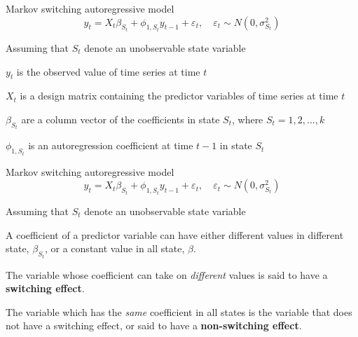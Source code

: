 \documentclass{beamer}
\begin{document}
\begin{frame}

\begin{block}{Markov switching autoregressive model}
\[
y_{t} = X_{t}\beta_{S_{t}} + \phi_{1,S_{t}} y_{t-1} + \varepsilon_{t}, \quad \varepsilon_{t} \sim N(0,\sigma^{2}_{S_{t}})
\]
\end{block}

Assuming that $S_{t}$ denote an unobservable state variable

$y_{t}$ is the observed value of time series at time $t$ 

$X_{t}$ is a design matrix containing the predictor variables of time series at time $t$ 

$\beta_{S_{t}}$ are a column vector of the coefficients in state $S_{t}$, where $S_{t}=1,2,...,k$

$\phi_{1,S_{t}}$ is an autoregression coefficient at time $t-1$ in state $S_{t}$


\end{frame}

\begin{frame}

\begin{block}{Markov switching autoregressive model}
\[
y_{t} = X_{t}\beta_{S_{t}} + \phi_{1,S_{t}} y_{t-1} + \varepsilon_{t}, \quad \varepsilon_{t} \sim N(0,\sigma^{2}_{S_{t}})
\]
\end{block}

Assuming that $S_{t}$ denote an unobservable state variable

\vspace{1em}

A coefficient of a predictor variable can have either different values in different state, $\beta_{S_{t}}$,  or a constant value in all state, $\beta$. 

\vspace{1em}

The variable whose coefficient can take on \textit{different} values is said to have a \textbf{switching effect}. 

\vspace{1em}

The variable which has the \textit{same} coefficient in all states is the variable that does not have a switching effect, or said to have a \textbf{non-switching effect}. 
\end{frame}
\end{document}
